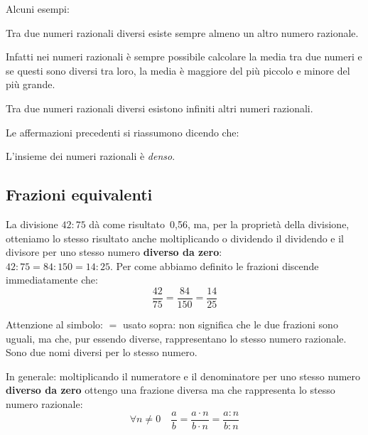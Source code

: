 Alcuni esempi:

\begin{teorema}{}{}
 Tra due numeri razionali diversi esiste sempre almeno un altro numero 
razionale.
\end{teorema}

Infatti nei numeri razionali è sempre possibile calcolare la media tra due 
numeri e se questi sono diversi tra loro, la media è maggiore del più 
piccolo e minore del più grande.

\begin{corollario}{}{}
 Tra due numeri razionali diversi esistono infiniti altri numeri razionali.
\end{corollario}

Le affermazioni precedenti si riassumono dicendo che:

\begin{definizione}{}{}
 L'insieme dei numeri razionali è \emph{denso}.
\end{definizione}

\subsection{Frazioni equivalenti}
\label{sub:razionali_equivalenti}

La divisione \(42 : 75 \) dà come risultato~0,56, ma, per la 
proprietà della divisione, otteniamo lo stesso 
risultato anche moltiplicando o dividendo il dividendo e il divisore per 
uno stesso numero \textbf{diverso da zero}:\\
\(42 : 75 = 84 : 150 = 14 : 25\).
Per come abbiamo definito le frazioni discende immediatamente che:\\
\[\dfrac{42}{75} = \dfrac{84}{150} = \dfrac{14}{25}\]
\begin{osservazione}{}{}
Attenzione al simbolo: \(=\) usato sopra: non significa che le due frazioni 
sono uguali, ma che, pur essendo diverse, rappresentano lo stesso numero 
razionale. 
Sono due nomi diversi per lo stesso numero.
\end{osservazione}

In generale: moltiplicando il numeratore e il denominatore per uno stesso 
numero \textbf{diverso da zero} ottengo una frazione diversa ma che 
rappresenta lo stesso numero razionale:
\[\forall n \neq 0 \quad \frac{a}{b} = \frac{a \cdot n}{b \cdot n} =
  \frac{a : n}{b : n}\]

